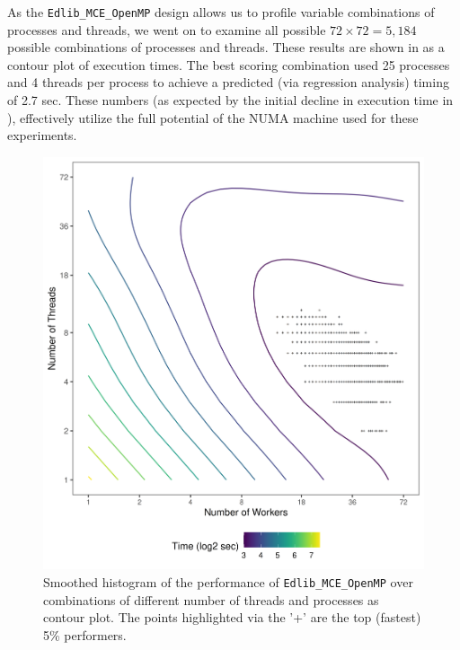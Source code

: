 \documentclass[10pt]{article}
\begin{document}
As the \texttt{Edlib\_MCE\_OpenMP} design allows us to profile variable combinations of processes and threads, we went on to examine all possible $72 \times 72 = 5,184$ possible combinations of processes and threads. These results are shown in  as a contour plot of execution times. The best scoring combination used 25 processes and 4 threads per process to achieve a  predicted (via regression analysis) timing of 2.7 sec. These numbers  (as expected by the initial decline in execution time in ), effectively utilize the full potential of the NUMA machine used for these experiments. 

\begin{figure}[H]
\centering  
\includegraphics[scale=1]{timings_MCE_with_OMP.png}
\caption{Smoothed histogram of the performance of \texttt{Edlib\_MCE\_OpenMP} over combinations of different number of threads and processes as contour plot. The points highlighted via the '+' are the top (fastest) 5\% performers.  }
\label{fig:ProcessesThreadsContour}
\end{figure}
\newpage
\end{document}
